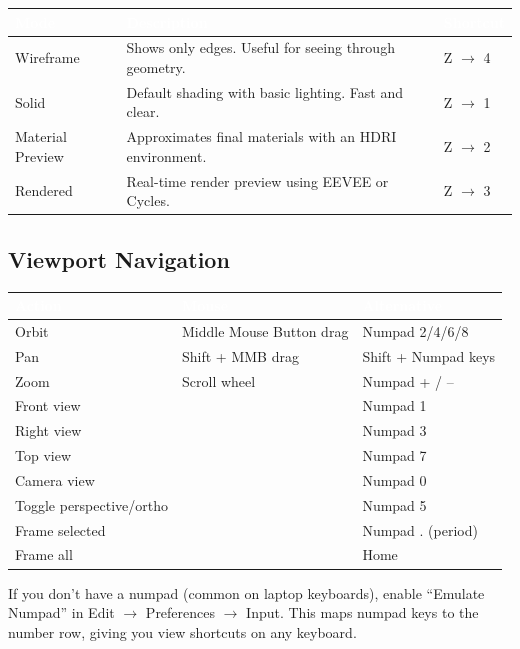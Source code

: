\documentclass[11pt,letterpaper,twoside,openright]{book}
\newcommand{\tableheader}[1]{\textbf{\sffamily\textcolor{white}{#1}}}
\begin{document}
\begin{center}
\begin{tabularx}{\textwidth}{L{3.5cm}XC{2.5cm}}
\toprule
{}
\tableheader{Mode} & \tableheader{Description} & \tableheader{Shortcut} \\
\midrule
Wireframe & Shows only edges. Useful for seeing through geometry. & Z $\rightarrow$ 4 \\
Solid & Default shading with basic lighting. Fast and clear. & Z $\rightarrow$ 1 \\
Material Preview & Approximates final materials with an HDRI environment. & Z $\rightarrow$ 2 \\
Rendered & Real-time render preview using EEVEE or Cycles. & Z $\rightarrow$ 3 \\
\bottomrule
\end{tabularx}
\end{center}

\subsection{Viewport Navigation}

\begin{shortcutbox}
\begin{center}
\begin{tabularx}{\textwidth}{L{4cm}XL{3.5cm}}
\toprule
{}
\tableheader{Action} & \tableheader{Mouse} & \tableheader{Alternative} \\
\midrule
Orbit & Middle Mouse Button drag & Numpad 2/4/6/8 \\
Pan & Shift + MMB drag & Shift + Numpad keys \\
Zoom & Scroll wheel & Numpad + / -- \\
Front view & & Numpad 1 \\
Right view & & Numpad 3 \\
Top view & & Numpad 7 \\
Camera view & & Numpad 0 \\
Toggle perspective/ortho & & Numpad 5 \\
Frame selected & & Numpad . (period) \\
Frame all & & Home \\
\bottomrule
\end{tabularx}
\end{center}
\end{shortcutbox}

\begin{tipbox}
If you don't have a numpad (common on laptop keyboards), enable ``Emulate Numpad'' in Edit $\rightarrow$ Preferences $\rightarrow$ Input. This maps numpad keys to the number row, giving you view shortcuts on any keyboard.
\end{tipbox}
\end{document}
